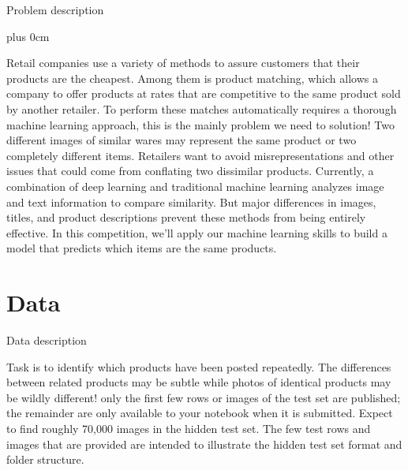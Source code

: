 \documentclass[
 size=14pt,
 paper=smartboard,  %
 mode=present, 		%
 display=slides, 	%
 style=tuliplab,  	%
 pauseslide,
 fleqn,leqno]{powerdot}
\renewcommand{\raggedright}{\leftskip=0pt \rightskip=0pt plus 0cm}
\begin{document}
\begin{slide}{Problem description}

\raggedright

Retail companies use a variety of methods to assure customers that their products are the cheapest. Among them is product matching, which allows a company to offer products at rates that are competitive to the same product sold by another retailer. To perform these matches automatically requires a thorough machine learning approach, this is the mainly problem we need to solution!
\bigskip
Two different images of similar wares may represent the same product or two completely different items. Retailers want to avoid misrepresentations and other issues that could come from conflating two dissimilar products. Currently, a combination of deep learning and traditional machine learning analyzes image and text information to compare similarity. But major differences in images, titles, and product descriptions prevent these methods from being entirely effective.
\bigskip
In this competition, we’ll apply our machine learning skills to build a model that predicts which items are the same products.
\end{slide}



\section{Data}

\begin{slide}{Data description}

Task is to identify which products have been posted repeatedly. The differences between related products may be subtle while photos of identical products may be wildly different!
\bigskip
only the first few rows or images of the test set are published; the remainder are only available to your notebook when it is submitted. Expect to find roughly 70,000 images in the hidden test set. The few test rows and images that are provided are intended to illustrate the hidden test set format and folder structure.

\end{slide}
\end{document}
